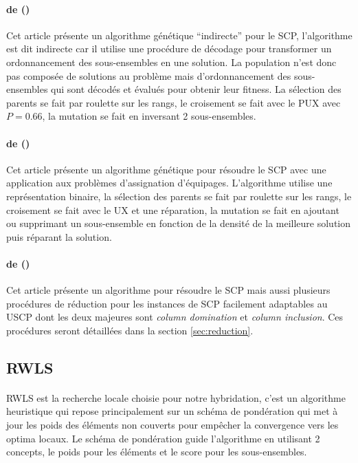 \documentclass[a4paper,11pt,twoside,french,report]{../common/simplem}
\begin{document}
				\paragraph*{ de \citeauthor{Aickelin2002} (\citeyear{Aickelin2002})~\cite{Aickelin2002}\\}
					Cet article présente un algorithme génétique ``indirecte'' pour le \gls{SCP}, l'algorithme est dit indirecte car il utilise une procédure de décodage pour transformer un ordonnancement des sous-ensembles en une solution. La population n'est donc pas composée de solutions au problème mais d'ordonnancement des sous-ensembles qui sont décodés et évalués pour obtenir leur fitness. La sélection des parents se fait par roulette sur les rangs, le croisement se fait avec le \gls{PUX} avec \(P = 0.66\), la mutation se fait en inversant 2 sous-ensembles.
				\paragraph*{ de \citeauthor{Kornilakis2002} (\citeyear{Kornilakis2002})~\cite{Kornilakis2002}\\}
					Cet article présente un algorithme génétique pour résoudre le \gls{SCP} avec une application aux problèmes d'assignation d'équipages. L'algorithme utilise une représentation binaire, la sélection des parents se fait par roulette sur les rangs, le croisement se fait avec le \gls{UX} et une réparation, la mutation se fait en ajoutant ou supprimant un sous-ensemble en fonction de la densité de la meilleure solution puis réparant la solution.
				\paragraph*{ de \citeauthor{Beasley1987} (\citeyear{Beasley1987})~\cite{Beasley1987}\\}
					Cet article présente un algorithme pour résoudre le \gls{SCP} mais aussi plusieurs procédures de réduction pour les instances de \gls{SCP} facilement adaptables au \gls{USCP} dont les deux majeures sont \textit{column domination} et \textit{column inclusion}. Ces procédures seront détaillées dans la section \ref{sec:reduction}.
			\subsection{\acrshort{RWLS}}\label{sec:RWLS}
				\paragraph*{}
					\gls{RWLS} est la recherche locale choisie pour notre hybridation, c'est un algorithme heuristique qui repose principalement sur un schéma de pondération qui met à jour les poids des éléments non couverts pour empêcher la convergence vers les optima locaux. Le schéma de pondération guide l'algorithme en utilisant 2 concepts, le poids pour les éléments et le score pour les sous-ensembles.
\end{document}
